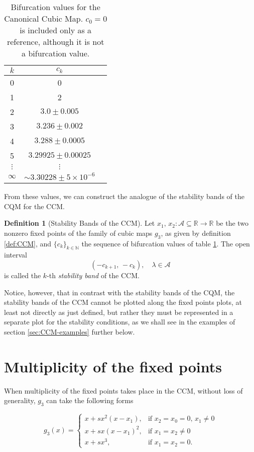 \documentclass[10pt,twoside,titlepage]{book}
\numberwithin{equation}{chapter}
\numberwithin{figure}{chapter}
\numberwithin{table}{chapter}
\theoremstyle{plain}%
\theoremstyle{definition}
\newtheorem{defn}{Definition}[chapter]
\theoremstyle{remark}
\begin{document}
\begin{table}
	\begin{tabular}[]{|c|c|c|}
		\hline
		$k$ & $c_k$ \tabularnewline
		\hline
		0 & 0 \tabularnewline
		\hline
		1 & 2 \tabularnewline
		\hline
		2 & $3.0\pm0.005$\tabularnewline
		\hline
		3 & $3.236\pm0.002$\tabularnewline
		\hline
		4 & $3.288\pm0.0005$\tabularnewline
		\hline
		5 & $3.29925\pm0.00025$\tabularnewline
		\hline
		$\vdots$ & $\vdots$\tabularnewline
		\hline
		$\infty$ & $\sim3.30228\pm5\times10^{-6}$\tabularnewline
		\hline
	\end{tabular}
	\caption{Bifurcation values for the Canonical Cubic Map. $c_0=0$ is included only as a reference, although it is not a bifurcation value.}
	\label{tab:CCM-BifurcationValues}
\end{table}

From these values, we can construct the analogue of the stability bands of the CQM for the CCM.

\begin{defn}[Stability Bands of the CCM]
	Let $x_1,\,x_2:\mathcal{A}\subseteq\mathbb{R}\rightarrow\mathbb{R}$ be the two nonzero fixed points of the family of cubic maps $g_3$, as given by definition \ref{def:CCM}, and $\{c_k\}_{k\in\mathbb{N}}$ the sequence of bifurcation values of table \ref{tab:CCM-BifurcationValues}. The open interval
	\begin{equation}
		\left(-c_{k+1},\,-c_k\right),\quad\lambda\in\mathcal{A}
	\end{equation}
	is called the $k$-th \emph{stability band} of the CCM.
\end{defn}

Notice, however, that in contrast with the stability bands of the CQM, the stability bands of the CCM cannot be plotted along the fixed points plots, at least not directly as just defined, but rather they must be represented in a separate plot for the stability conditions, as we shall see in the examples of section \ref{sec:CCM-examples} further below.

\section{Multiplicity of the fixed points}
\label{sec:CCM-multiplicity}

When multiplicity of the fixed points takes place in the CCM, without loss of generality, $g_3$ can take the following forms

\begin{equation}
	g_3(x)=
	\begin{cases}
		x + sx^2(x-x_1),	&\text{if } x_2=x_0=0,\,x_1\neq0\\
		x + sx(x-x_1)^2, 	&\text{if } x_1=x_2\neq0\\
		x + sx^3,			&\text{if } x_1=x_2=0.
	\end{cases}
\end{equation}
\end{document}
